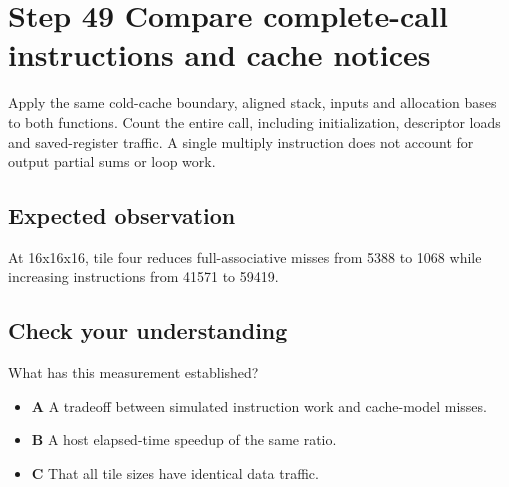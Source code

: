 \section{Step 49 Compare complete-call instructions and cache notices}\label{matmul-s49}

Apply the same cold-cache boundary, aligned stack, inputs and allocation bases to both functions. Count the entire call, including initialization, descriptor loads and saved-register traffic. A single multiply instruction does not account for output partial sums or loop work.

\subsection{Expected observation}
At 16x16x16, tile four reduces full-associative misses from 5388 to 1068 while increasing instructions from 41571 to 59419.

\subsection{Check your understanding}
What has this measurement established?

\begin{itemize}
  \item \textbf{A} A tradeoff between simulated instruction work and cache-model misses.
  \item \textbf{B} A host elapsed-time speedup of the same ratio.
  \item \textbf{C} That all tile sizes have identical data traffic.
\end{itemize}
